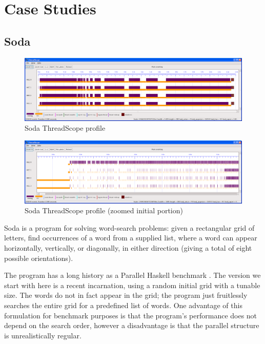 \documentclass[twocolumn,9pt]{sigplanconf}
\let\cite=\citep
\begin{document}


\section{Case Studies}



\subsection{Soda}

\begin{figure}
\begin{center}
\includegraphics[scale=0.3]{soda1.png}
\end{center}
\caption{Soda ThreadScope profile}
\label{f:soda-threadscope}
\end{figure}

\begin{figure}
\begin{center}
\includegraphics[scale=0.3]{soda2.png}
\end{center}
\caption{Soda ThreadScope profile (zoomed initial portion)}
\label{f:soda-threadscope2}
\end{figure}

Soda is a program for solving word-search problems: given a
rectangular grid of letters, find occurrences of a word from a
supplied list, where a word can appear horizontally, vertically, or
diagonally, in either direction (giving a total of eight possible
orientations).

The program has a long history as a Parallel Haskell benchmark \cite{Runciman93profilingparallel}.
The version we start with here is a recent incarnation,
using a random initial grid with a tunable size.  The words do not in
fact appear in the grid; the program just fruitlessly searches the
entire grid for a predefined list of words.  One advantage of this
formulation for benchmark purposes is that the program's performance
does not depend on the search order, however a disadvantage is that
the parallel structure is unrealistically regular.
\end{document}
